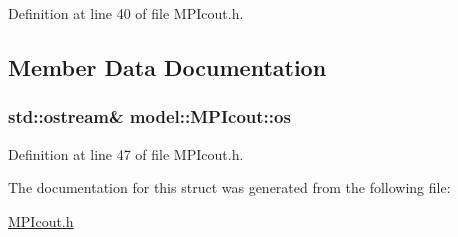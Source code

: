 Definition at line 40 of file M\+P\+Icout.\+h.



\subsection{Member Data Documentation}
\hypertarget{structmodel_1_1_m_p_icout_a7d375aac88a5d15d09bb1542482ee6a1}{}
\subsubsection[{os}]{\setlength{\rightskip}{0pt plus 5cm}std\+::ostream\& model\+::\+M\+P\+Icout\+::os}\label{structmodel_1_1_m_p_icout_a7d375aac88a5d15d09bb1542482ee6a1}


Definition at line 47 of file M\+P\+Icout.\+h.



The documentation for this struct was generated from the following file\+:\begin{DoxyCompactItemize}
\item 
\hyperlink{_m_p_icout_8h}{M\+P\+Icout.\+h}\end{DoxyCompactItemize}
